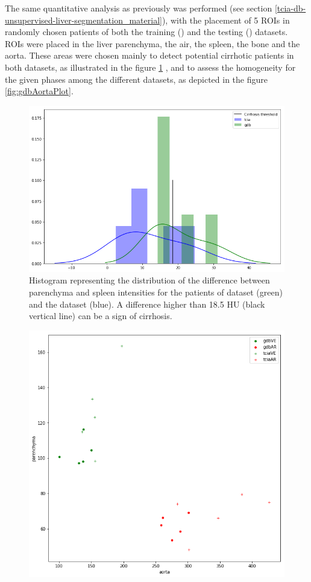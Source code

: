 {\begin{figure}[!ht]
\end{figure}
The same quantitative analysis as previously was performed (see section \ref{tcia-db-unsupervised-liver-segmentation_material}), with the placement of 5 ROIs in randomly chosen patients of both the training (\textbf{}) and the testing (\textbf{}) datasets. ROIs were placed in the liver parenchyma, the air, the spleen, the bone and the aorta. These areas were chosen mainly to detect potential cirrhotic patients in both datasets, as illustrated in the figure \ref{fig:cirrhoticPatPlot} , and to assess the homogeneity for the given phases among the different datasets, as depicted in the figure \ref{fig:gdbAortaPlot}. 
\begin{figure}[!ht]
	\begin{mdframed}[backgroundcolor=blue!50,linecolor=blue!50]
		\centering
		\includegraphics[width=0.6\linewidth]{images/Gdb_TCIA_cirrhosisPlot_bins5}
		\caption{Histogram representing the distribution of the difference between parenchyma and spleen intensities for the patients of  \textbf{} dataset (green) and the  \textbf{} dataset (blue). A difference higher than 18.5 HU (black vertical line) can be a sign of cirrhosis.
		}
		\label{fig:cirrhoticPatPlot}
	\end{mdframed}
\end{figure}
\begin{figure}[!ht]
	\begin{mdframed}[backgroundcolor=blue!50,linecolor=blue!50]
		\centering
		\includegraphics[width=0.6\linewidth]{images/AortaParPlot_Gdb_2}

\end{mdframed}
\end{figure}}
